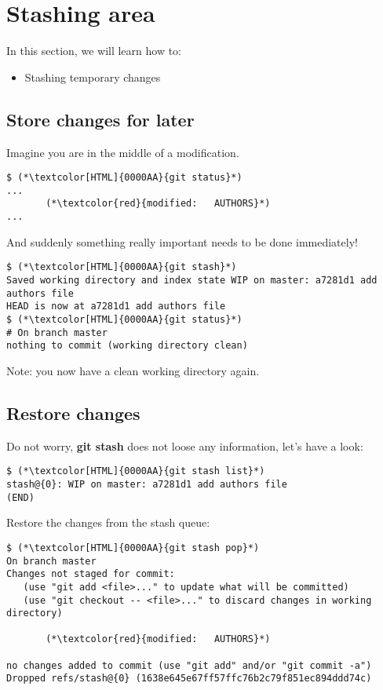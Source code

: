 \section{Stashing area}
\begin{frame}[fragile]
  \slidetitle

  In this section, we will learn how to:
  \begin{itemize}
    \item Stashing temporary changes
  \end{itemize}
\end{frame}


\subsection{Store changes for later}
\begin{frame}[fragile]
\subslidetitle

Imagine you are in the middle of a modification.

\begin{lstlisting}
$ (*\textcolor[HTML]{0000AA}{git status}*)
...
       (*\textcolor{red}{modified:   AUTHORS}*)
...
\end{lstlisting}

And suddenly something really important needs to be done immediately!

\begin{lstlisting}
$ (*\textcolor[HTML]{0000AA}{git stash}*)
Saved working directory and index state WIP on master: a7281d1 add authors file
HEAD is now at a7281d1 add authors file
$ (*\textcolor[HTML]{0000AA}{git status}*)
# On branch master
nothing to commit (working directory clean)
\end{lstlisting}
Note: you now have a clean working directory again.
\end{frame}


\subsection{Restore changes}
\begin{frame}[fragile]
\subslidetitle

Do not worry, \textbf{git stash} does not loose any information, let's have a look:

\begin{lstlisting}
$ (*\textcolor[HTML]{0000AA}{git stash list}*)
stash@{0}: WIP on master: a7281d1 add authors file
(END)
\end{lstlisting}

Restore the changes from the stash queue:

\begin{lstlisting}
$ (*\textcolor[HTML]{0000AA}{git stash pop}*)
On branch master
Changes not staged for commit:
   (use "git add <file>..." to update what will be committed)
   (use "git checkout -- <file>..." to discard changes in working directory)

       (*\textcolor{red}{modified:   AUTHORS}*)

no changes added to commit (use "git add" and/or "git commit -a")
Dropped refs/stash@{0} (1638e645e67ff57ffc76b2c79f851ec894ddd74c)
\end{lstlisting}
\end{frame}
